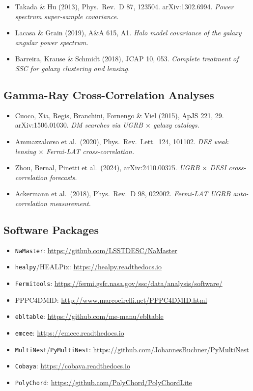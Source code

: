 \documentclass[10pt,a4paper]{article}
\begin{document}
\begin{itemize}[leftmargin=2em]
\item Takada \& Hu (2013), Phys.\ Rev.\ D 87, 123504. arXiv:1302.6994. \textit{Power spectrum super-sample covariance.}
\item Lacasa \& Grain (2019), A\&A 615, A1. \textit{Halo model covariance of the galaxy angular power spectrum.}
\item Barreira, Krause \& Schmidt (2018), JCAP 10, 053. \textit{Complete treatment of SSC for galaxy clustering and lensing.}
\end{itemize}

\subsection{Gamma-Ray Cross-Correlation Analyses}

\begin{itemize}[leftmargin=2em]
\item Cuoco, Xia, Regis, Branchini, Fornengo \& Viel (2015), ApJS 221, 29. arXiv:1506.01030. \textit{DM searches via UGRB $\times$ galaxy catalogs.}
\item Ammazzalorso et al.\ (2020), Phys.\ Rev.\ Lett.\ 124, 101102. \textit{DES weak lensing $\times$ Fermi-LAT cross-correlation.}
\item Zhou, Bernal, Pinetti et al.\ (2024), arXiv:2410.00375. \textit{UGRB $\times$ DESI cross-correlation forecasts.}
\item Ackermann et al.\ (2018), Phys.\ Rev.\ D 98, 022002. \textit{Fermi-LAT UGRB auto-correlation measurement.}
\end{itemize}

\subsection{Software Packages}

\begin{itemize}[leftmargin=2em]
\item \texttt{NaMaster}: \url{https://github.com/LSSTDESC/NaMaster}
\item \texttt{healpy}/HEALPix: \url{https://healpy.readthedocs.io}
\item \texttt{Fermitools}: \url{https://fermi.gsfc.nasa.gov/ssc/data/analysis/software/}
\item PPPC4DMID: \url{http://www.marcocirelli.net/PPPC4DMID.html}
\item \texttt{ebltable}: \url{https://github.com/me-manu/ebltable}
\item \texttt{emcee}: \url{https://emcee.readthedocs.io}
\item \texttt{MultiNest}/\texttt{PyMultiNest}: \url{https://github.com/JohannesBuchner/PyMultiNest}
\item \texttt{Cobaya}: \url{https://cobaya.readthedocs.io}
\item \texttt{PolyChord}: \url{https://github.com/PolyChord/PolyChordLite}
\end{itemize}
\end{document}
